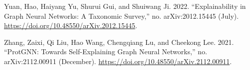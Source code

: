 \documentclass[
  11pt,
  letterpaper,
]{article}
\newlength{\cslhangindent}
\newlength{\cslentryspacingunit} %
\newenvironment{CSLReferences}[2] %
 {%
  \setlength{\parindent}{0pt}
  \ifodd #1
  \let\oldpar\par
  \def\par{\hangindent=\cslhangindent\oldpar}
  \fi
  \setlength{\parskip}{#2\cslentryspacingunit}
 }%
 {}
\begin{document}
\begin{CSLReferences}{1}{0}
\leavevmode{}%
Yuan, Hao, Haiyang Yu, Shurui Gui, and Shuiwang Ji. 2022.
{``Explainability in Graph Neural Networks: A Taxonomic Survey,''} no.
arXiv:2012.15445 (July).
\url{https://doi.org/10.48550/arXiv.2012.15445}.

\leavevmode{}%
Zhang, Zaixi, Qi Liu, Hao Wang, Chengqiang Lu, and Cheekong Lee. 2021.
{``ProtGNN: Towards Self-Explaining Graph Neural Networks,''} no.
arXiv:2112.00911 (December).
\url{https://doi.org/10.48550/arXiv.2112.00911}.

\end{CSLReferences}
\end{document}
